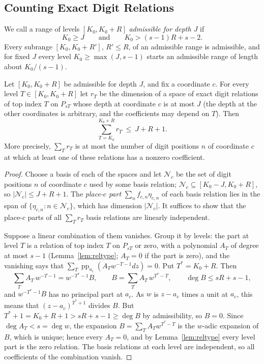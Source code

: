 \subsection{Counting Exact Digit Relations}\label{sec:countthm}
We call a range of levels $[K_0,K_0+R]$ \emph{admissible for depth $J$} if
\[
K_0\ge J\qquad\text{and}\qquad K_0>(s-1)R+s-2 .
\]
Every subrange $[K_0,K_0+R']$, $R'\le R$, of an admissible range is admissible, and for fixed $J$ every level $K_0\ge\max(J,s-1)$ starts an admissible range of length about $K_0/(s-1)$.

\begin{theorem}\label{thm:count}
Let $[K_0,K_0+R]$ be admissible for depth $J$, and fix a coordinate $c$. For every level $T\in[K_0,K_0+R]$ let $r_T$ be the dimension of a space of exact digit relations of top index $T$ on $P_{sT}$ whose depth at coordinate $c$ is at most $J$ (the depth at the other coordinates is arbitrary, and the coefficients may depend on $T$). Then
\[
\sum_{T=K_0}^{K_0+R}r_T\ \le\ J+R+1 .
\]
More precisely, $\sum_Tr_T$ is at most the number of digit positions $n$ of coordinate $c$ at which at least one of these relations has a nonzero coefficient.
\end{theorem}

\begin{proof}
Choose a basis of each of the spaces and let $\mathcal N_c$ be the set of digit positions $n$ of coordinate $c$ used by some basis relation; $\mathcal N_c\subseteq[K_0-J,K_0+R]$, so $|\mathcal N_c|\le J+R+1$. The \emph{place-$c$ part} $\sum_nf_{c,n}\eta_{c,n}$ of each basis relation lies in the span of $\{\eta_{c,n}:n\in\mathcal N_c\}$, which has dimension $|\mathcal N_c|$. It suffices to show that the place-$c$ parts of all $\sum_Tr_T$ basis relations are linearly independent.

Suppose a linear combination of them vanishes. Group it by levels: the part at level $T$ is a relation of top index $T$ on $P_{sT}$ or zero, with a polynomial $A_T$ of degree at most $s-1$ (Lemma~\ref{lem:reltype}; $A_T=0$ if the part is zero), and the vanishing says that $\sum_T\operatorname{pp}_{a_c}(A_Tw^{-T-1}dz)=0$. Put $T^*=K_0+R$. Then
\[
\sum_TA_T\,w^{-T-1}=w^{-T^*-1}B,\qquad B=\sum_TA_T\,w^{T^*-T},\qquad \deg B\le sR+s-1,
\]
and $w^{-T^*-1}B$ has no principal part at $a_c$. As $w$ is $z-a_c$ times a unit at $a_c$, this means that $(z-a_c)^{T^*+1}$ divides $B$. But $T^*+1=K_0+R+1>sR+s-1\ge\deg B$ by admissibility, so $B=0$. Since $\deg A_T<s=\deg w$, the expansion $B=\sum_TA_Tw^{T^*-T}$ is the $w$-adic expansion of $B$, which is unique; hence every $A_T=0$, and by Lemma~\ref{lem:reltype} every level part is the zero relation. The basis relations at each level are independent, so all coefficients of the combination vanish.
\end{proof}

